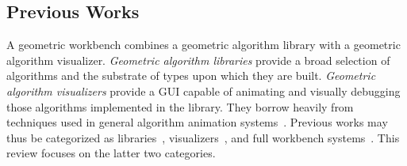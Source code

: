 
\subsection{Previous Works}

A geometric workbench combines a geometric algorithm library with a geometric
algorithm visualizer. \emph{Geometric algorithm libraries} provide a broad
selection of algorithms and the substrate of types upon which they are built.
\emph{Geometric algorithm visualizers} provide a GUI capable of animating and
visually debugging those algorithms implemented in the library. They borrow
heavily from techniques used in general algorithm animation
systems~\cite{brown1984system, stasko1990tango, stasko1995polka,
stasko1995samba}. Previous works may thus be categorized as
libraries~\cite{mehlhorn1989leda, fabri1998design, overmars1996designing,
fabri1996cgal}, visualizers~\cite{phillips1993geomview, hanson1994interactive,
amenta1995geomview, basken2002geowin}, and full workbench
systems~\cite{schorn1991robust, de1993geolab, de1993animation,
epstein1994workbench, tal1995visualization, shneerson1997gasp,
wei2009geobuilder}. This review focuses on the latter two categories.

